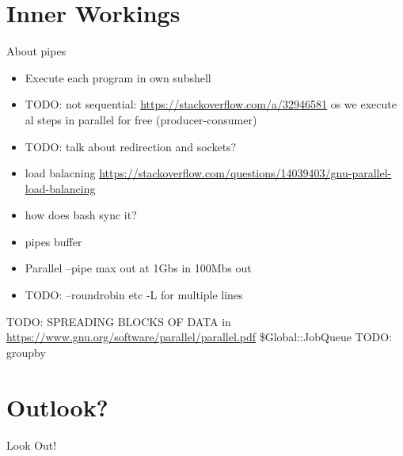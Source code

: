 \section{Inner Workings}
\begin{frame}{About pipes}
\begin{itemize}
   \item Execute each program in own subshell
   \item TODO: not sequential: \url{https://stackoverflow.com/a/32946581} os we execute al steps in parallel for free (producer-consumer) %
   \item TODO: talk about redirection and sockets?
   \item load balacning \url{https://stackoverflow.com/questions/14039403/gnu-parallel-load-balancing}
   \item how does bash sync it?
   \item pipes buffer
   \item Parallel --pipe max out at 1Gbs in 100Mbs out
   \item TODO: --roundrobin etc -L for multiple lines
\end{itemize}
\end{frame}
\begin{frame}
 TODO: SPREADING BLOCKS OF DATA
 in \url{https://www.gnu.org/software/parallel/parallel.pdf}
 \$Global::JobQueue
 TODO: groupby
\end{frame}

\section{Outlook?}
\begin{frame}{Look Out!}
\end{frame}

